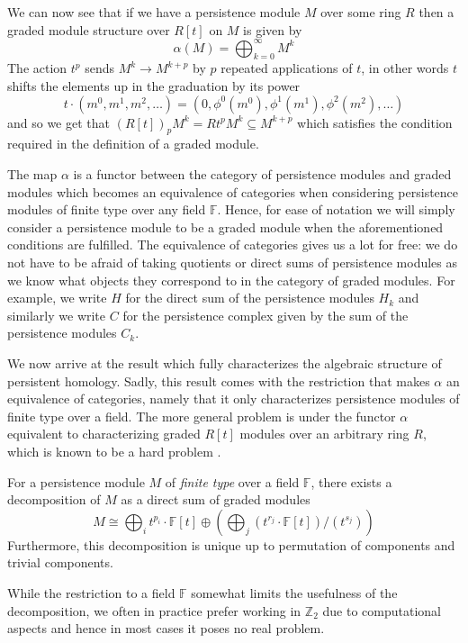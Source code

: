 We can now see that if we have a persistence module $M$ over some ring $R$ then a graded module structure over $R[t]$ on $M$ is given by
\[ \alpha(M) = \bigoplus^{\infty}_{k=0} M^{k}\]
The action $t^{p}$ sends $M^{k} \to M^{k+p}$ by $p$ repeated applications of $t$, in other words $t$ shifts the elements up in the graduation by its power
\[ t \cdot (m^{0}, m^{1}, m^{2}, \dots  ) = (0, \phi^{0}(m^{0}), \phi^{1}(m^{1}),\phi^{2}(m^{2}),\dots) \]
and so we get that $(R[t])_{p}M^{k} = Rt^{p}M^{k} \subseteq M^{k+p}$ which satisfies the condition required in the definition of a graded module.


The map $\alpha$ is a functor between the category of persistence modules and graded modules \cite{ghirst} which becomes an equivalence of categories when considering persistence modules of finite type over any field $\mathbb{F}$. Hence, for ease of notation we will simply consider a persistence module to be a graded module when the aforementioned conditions are fulfilled. The equivalence of categories gives us a lot for free: we do not have to be afraid of taking quotients or direct sums of persistence modules as we know what objects they correspond to in the category of graded modules. For example, we write $H$ for the direct sum of the persistence modules $H_{k}$ and similarly we write $C$ for the persistence complex given by the sum of the persistence modules $C_{k}$.

We now arrive at the result which fully characterizes the algebraic structure of persistent homology. Sadly, this result comes with the restriction that makes $\alpha$ an equivalence of categories, namely that it only characterizes persistence modules of finite type over a field. The more general problem is under the functor $\alpha$ equivalent to characterizing graded $R[t]$ modules over an arbitrary ring $R$, which is known to be a hard problem \cite{ghirst}.
\begin{theorem} \label{structurethm1}
  For a persistence module $M$ of \textit{finite type} over a field $\mathbb{F}$, there exists a decomposition of $M$ as a direct sum of graded modules
  \[M \cong \bigoplus_{i} t^{p_{i}} \cdot \mathbb{F}[t] \oplus (\bigoplus_{j} (t^{r_{j}} \cdot \mathbb{F}[t]) / (t^{s_{j}})) \]
  Furthermore, this decomposition is unique up to permutation of components and trivial components.

\end{theorem}

While the restriction to a field $\mathbb{F}$ somewhat limits the usefulness of the decomposition, we often in practice prefer working in $\mathbb{Z}_{2}$ due to computational aspects and hence in most cases it poses no real problem.

